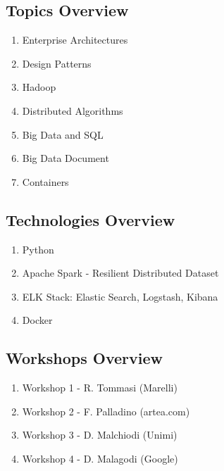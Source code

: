 \subsection{Topics Overview}
\begin{enumerate}
	\item Enterprise Architectures
	\item Design Patterns
	\item Hadoop
	\item Distributed Algorithms
	\item Big Data and SQL
	\item Big Data Document
	\item Containers
\end{enumerate}

\subsection{Technologies Overview}
\begin{enumerate}
	\item Python
	\item Apache Spark - Resilient Distributed Dataset
	\item ELK Stack: Elastic Search, Logstash, Kibana
	\item Docker
\end{enumerate}

\subsection{Workshops Overview}
\begin{enumerate}
	\item Workshop 1 - R. Tommasi (Marelli)
	\item Workshop 2 - F. Palladino (artea.com)
	\item Workshop 3 - D. Malchiodi (Unimi)
	\item Workshop 4 - D. Malagodi (Google)
\end{enumerate}
